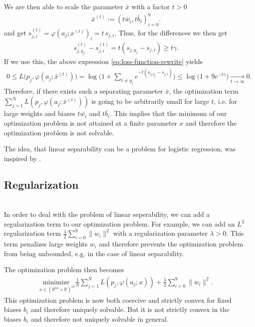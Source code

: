 We are then able to scale the parameter $\bar x$ with a factor $t>0$
\begin{align*} 
    \bar x^{(t)} := (t \bar{w}_i, t \bar{b}_i)_{i=0}^9. 
\end{align*}
and get $s_{j,i}^{(t)} = \varphi(a_j;x^{(t)})_i = t\,s_{j,i}$. Thus, for the differences we then get
\begin{align*}
    s_{j,y_j}^{(t)}-s_{j,i}^{(t)} = t(s_{j,y_j}-s_{j,i}) \ge t\gamma.
\end{align*}
If we use this, the above expression \cref{eq:loss-function-rewrite} yields
\begin{align*}
    0 
    \leq L\big(p_j,\varphi(a_j;\bar x^{(t)})\big)
    = \log\Big(1+\sum_{i\neq y_j} e^{-t(s_{j,y_j}-s_{j,i})}\Big)
    \leq \log\big(1+9e^{-t\gamma}\big)\xrightarrow[t\to\infty]{} 0.
\end{align*}
Therefore, if there exists such a separating parameter $\bar x$, the optimization term $\sum_{j=1}^N L(p_j,\varphi(a_j;\bar x^{(t)}))$ is going to be arbitrarily small for large $t$, i.e. for large weights and biases $t \bar{w_i}$ and $t \bar{b_i}$.
This implies that the minimum of our optimization problem is not attained at a finite parameter $x$ and therefore the optimization problem is not solvable.
\begin{rem}
    The idea, that linear separability can be a problem for logistic regression, was inspired by \cite[Linear Separability and Regularization]{Adams2018}.
\end{rem}

\subsection{Regularization}\;\\
In order to deal with the problem of linear seperability, we can add a regularization term to our optimization problem. For example, we can add an $L^2$ regularization term $\frac{\lambda}{2} \sum_{i=0}^9 \|w_i\|^2$ with a regularization parameter $\lambda >0$. This term penalizes large weights $w_i$ and therefore prevents the optimization problem from being unbounded, e.g. in the case of linear separability.

The optimization problem then becomes
\begin{align*}
    \underset{x\in(\mathbb{R}^{64}\times \mathbb{R})^{10}}{\text{minimize }} \frac{1}{N}\sum_{j=1}^N L(p_j,\varphi(a_j;x)) + \frac{\lambda}{2} \sum_{i=0}^9 \|w_i\|^2.
\end{align*}
This optimization problem is now both coercive and strictly convex for fixed biases $b_i$ and therefore uniquely solvable. But it is not strictly convex in the biases $b_i$ and therefore not uniquely solvable in general.


